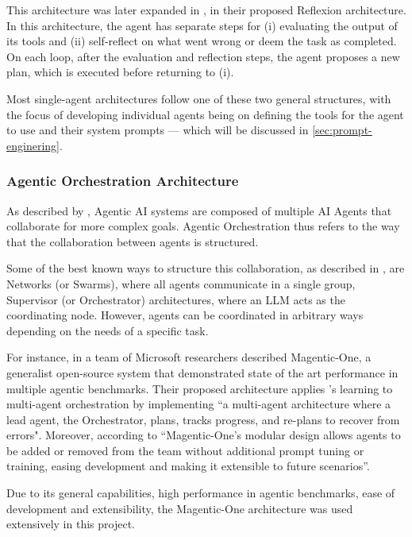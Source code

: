 \documentclass[a4paper]{report}
\begin{document}
This architecture was later expanded in \cite{shinn2023reflexion}, in their proposed Reflexion architecture. In this architecture, the agent has separate steps for (i) evaluating the output of its tools and (ii) self-reflect on what went wrong or deem the task as completed. On each loop, after the evaluation and reflection steps, the agent proposes a new plan, which is executed before returning to (i).

Most single-agent architectures follow one of these two general structures, with the focus of developing individual agents being on defining the tools for the agent to use and their system prompts --- which will be discussed in \autoref{sec:prompt-enginering}.

\subsubsection{Agentic Orchestration Architecture}

As described by \cite{sapkota2025aiagentsvsagentic}, Agentic AI systems are composed of multiple AI Agents that collaborate for more complex goals. Agentic Orchestration thus refers to the way that the collaboration between agents is structured.

Some of the best known ways to structure this collaboration, as described in \cite{langgraphagmultiagentsystems}, are Networks (or Swarms), where all agents communicate in a single group, Supervisor (or Orchestrator) architectures, where an LLM acts as the coordinating node. However, agents can be coordinated in arbitrary ways depending on the needs of a specific task.

For instance, in \cite{fourney2024magenticone} a team of Microsoft researchers described Magentic-One, a generalist open-source system that demonstrated state of the art performance in multiple agentic benchmarks. Their proposed architecture applies \cite{shinn2023reflexion}'s learning to multi-agent orchestration by implementing ``a multi-agent architecture where a lead agent, the Orchestrator, plans, tracks progress, and re-plans to recover from errors". Moreover, according to \cite{fourney2024magenticone} ``Magentic-One's modular design allows agents to be added or removed from the team without additional prompt tuning or training, easing development and making it extensible to future scenarios''.

Due to its general capabilities, high performance in agentic benchmarks, ease of development and extensibility, the Magentic-One architecture was used extensively in this project.
\end{document}
